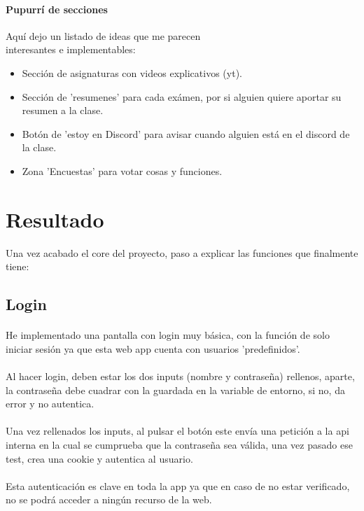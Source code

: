 \documentclass[a4paper]{article}
\begin{document}
\paragraph{Pupurrí de secciones }
Aquí dejo un listado de ideas que me parecen\\ interesantes e implementables:
\begin{itemize}
    \item Sección de asignaturas con videos explicativos (yt).
    \item Sección de 'resumenes' para cada exámen, por si alguien quiere aportar su resumen a la clase.
    \item Botón de 'estoy en Discord' para avisar cuando alguien está en el discord de la clase.
    \item Zona 'Encuestas' para votar cosas y funciones.
\end{itemize}
\date{\today}
\section[Resultado]{Resultado}
 Una vez acabado el core del proyecto, paso a explicar las funciones que finalmente tiene:
 \subsection[/]{Login}
 \paragraph{}
 He implementado una pantalla con login muy básica, con la función de solo iniciar sesión ya que 
 esta web app cuenta con usuarios 'predefinidos'.
 \paragraph{}
 Al hacer login, deben estar los dos inputs (nombre y contraseña) rellenos, aparte, la contraseña 
 debe cuadrar con la guardada en la variable de entorno, si no, da error y no autentica.
 \paragraph{}
 Una vez rellenados los inputs, al pulsar el botón este envía una petición a la api interna en la cual 
 se cumprueba que la contraseña sea válida, una vez pasado ese test, crea una cookie y autentica
 al usuario.
 \paragraph{}
 Esta autenticación es clave en toda la app ya que en caso de no estar verificado, no se podrá acceder
 a ningún recurso de la web.
\end{document}
